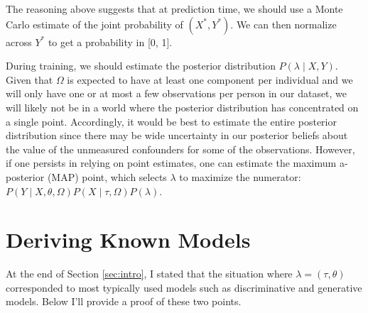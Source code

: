 \documentclass{article}
\begin{document}
The reasoning above suggests that at prediction time, we should use a Monte Carlo estimate of the joint probability of $\left( X^{*}, Y^{*} \right)$. We can then normalize across $Y^{*}$ to get a probability in [0, 1].

During training, we should estimate the posterior distribution $P \left( \lambda \mid X, Y \right)$. Given that $\Omega$ is expected to have at least one component per individual and we will only have one or at most a few observations per person in our dataset, we will likely not be in a world where the posterior distribution has concentrated on a single point. Accordingly, it would be best to estimate the entire posterior distribution since there may be wide uncertainty in our posterior beliefs about the value of the unmeasured confounders for some of the observations. However, if one persists in relying on point estimates, one can estimate the maximum a-posterior (MAP) point, which selects $\lambda$ to maximize the numerator: $P \left( Y \mid X, \theta, \Omega \right) P \left( X \mid \tau, \Omega \right) P \left( \lambda \right)$.

\section{Deriving Known Models}
\label{sec:deriving-known-models}
At the end of Section \ref{sec:intro}, I stated that the situation where $\lambda = \left( \tau, \theta \right)$ corresponded to most typically used models such as discriminative and generative models. Below I'll provide a proof of these two points.
\end{document}
